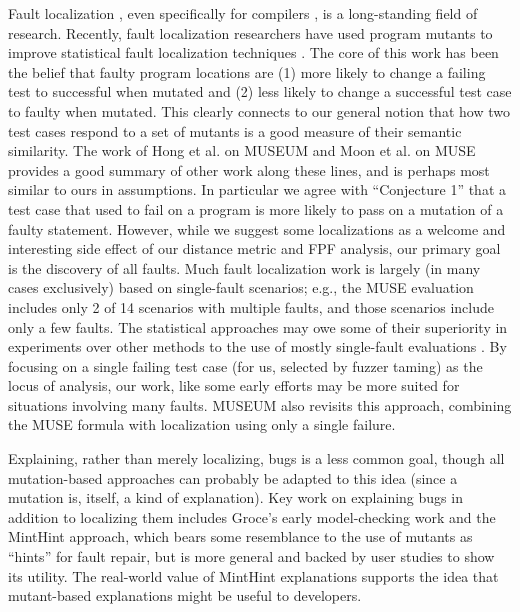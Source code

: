 Fault localization \cite{FaultSurvey,NearNeighbor,Liblit03,Liblit05,Cleve05,Jones2002,Jones05,Jones07,GroceError,ChakiLev,Liu06,SPIN03,Santelices:ICSE:2009,Abreu:2006:PRDC,xuan2014test,DD}, even specifically for compilers \cite{Whalley94}, is a long-standing field of research.  Recently, fault localization researchers have used program mutants to improve statistical \cite{Jones2002} fault localization techniques \cite{MUSE,DebroyMutant,FasterMutant,multilingual,Metallaxis,Papadakis}.
The core of this work has been the belief that faulty program locations are (1) more likely to change a failing test to successful when mutated and (2) less likely to change a successful test case to faulty when mutated.  This clearly connects to our general notion that how two test cases respond to a set of mutants is a good measure of their semantic similarity.
The work of Hong et al. \cite{multilingual} on MUSEUM and Moon et al. \cite{MUSE} on MUSE provides a good summary of other work along these lines, and is perhaps most similar to ours in assumptions. In particular we agree with ``Conjecture 1'' that a test case that used to fail on a program is more likely to pass on a mutation of a faulty statement.  However, while we suggest some localizations as a welcome and interesting side effect of our distance metric and FPF analysis, our primary goal is the discovery of all faults. Much fault localization work is largely (in many cases exclusively) based on single-fault scenarios; e.g., the MUSE \cite{MUSE} evaluation includes only 2 of 14 scenarios with multiple faults, and those scenarios include only a few faults.   The statistical approaches may owe some of their superiority in experiments over other methods to the use of mostly single-fault evaluations \cite{Jones05}.  By focusing on a single failing test case (for us, selected by fuzzer taming) as the locus of analysis, our work, like some early efforts \cite{NearNeighbor,Cleve05,GroceError} may be more suited for situations involving many faults.  MUSEUM \cite{multilingual} also revisits this approach, combining the MUSE formula with localization using only a single failure.

Explaining, rather than merely localizing, bugs is a less common goal, though all mutation-based approaches can probably be adapted to this idea (since a mutation is, itself, a kind of explanation).  Key work on explaining bugs in addition to localizing them includes Groce's early model-checking work \cite{GroceError,ChakiLev} and the MintHint \cite{MintHint} approach, which bears some resemblance to the use of mutants as ``hints'' for fault repair, but is more general and backed by user studies to show its utility.  The real-world value of MintHint explanations supports the idea that mutant-based explanations might be useful to developers.

